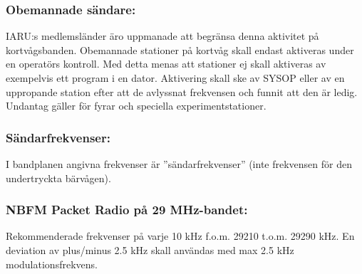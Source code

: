 \subsubsection{Obemannade sändare:}

IARU:s medlemsländer äro uppmanade att begränsa
denna aktivitet på kortvågsbanden.
Obemannade stationer på kortvåg skall endast aktiveras under en operatörs kontroll.
Med detta menas att stationer ej skall aktiveras av
exempelvis ett program i en dator. Aktivering skall ske
av SYSOP eller av en uppropande station efter att de
avlyssnat frekvensen och funnit att den är ledig.
Undantag gäller för fyrar och speciella experimentstationer.

\subsubsection{Sändarfrekvenser:}

I bandplanen angivna frekvenser är ''sändarfrekvenser''
(inte frekvensen för den undertryckta bärvågen).

\subsubsection{NBFM Packet Radio på 29 MHz-bandet:}

Rekommenderade frekvenser på varje 10 kHz f.o.m.
29210 t.o.m. 29290 kHz. En deviation av plus/minus 2.5
kHz skall användas med max 2.5 kHz modulationsfrekvens.
